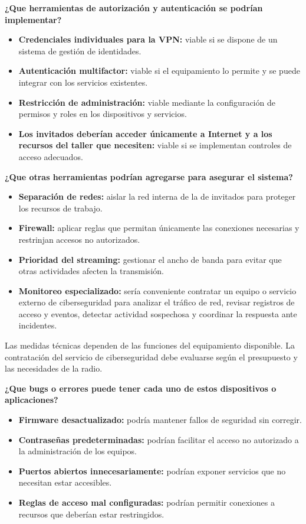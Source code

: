 \documentclass[12pt,a4paper]{article}
\begin{document}
\par\textbf{¿Que herramientas de autorización y autenticación se podrían implementar?}
\begin{itemize}
    \item \textbf{Credenciales individuales para la VPN:} viable si se dispone de un sistema de gestión de identidades.
    \item \textbf{Autenticación multifactor:} viable si el equipamiento lo permite y se puede integrar con los servicios existentes.
    \item \textbf{Restricción de administración:} viable mediante la configuración de permisos y roles en los dispositivos y servicios.
    \item \textbf{Los invitados deberían acceder únicamente a Internet y a los recursos del taller que necesiten:} viable si se implementan controles de acceso adecuados.
\end{itemize}
\par\textbf{¿Que otras herramientas podrían agregarse para asegurar el sistema?}
\begin{itemize}
    \item \textbf{Separación de redes:} aislar la red interna de la de invitados para proteger los recursos de trabajo.
    \item \textbf{Firewall:} aplicar reglas que permitan únicamente las conexiones necesarias y restrinjan accesos no autorizados.
    \item \textbf{Prioridad del streaming:} gestionar el ancho de banda para evitar que otras actividades afecten la transmisión.
    \item \textbf{Monitoreo especializado:} sería conveniente contratar un equipo o servicio externo de ciberseguridad para analizar el tráfico de red, revisar registros de acceso y eventos, detectar actividad sospechosa y coordinar la respuesta ante incidentes.
\end{itemize}
Las medidas técnicas dependen de las funciones del equipamiento disponible. La contratación del servicio de ciberseguridad debe evaluarse según el presupuesto y las necesidades de la radio.
\par\textbf{¿Que bugs o errores puede tener cada uno de estos dispositivos o aplicaciones?}
\begin{itemize}
    \item \textbf{Firmware desactualizado:} podría mantener fallos de seguridad sin corregir.
    \item \textbf{Contraseñas predeterminadas:} podrían facilitar el acceso no autorizado a la administración de los equipos.
    \item \textbf{Puertos abiertos innecesariamente:} podrían exponer servicios que no necesitan estar accesibles.
    \item \textbf{Reglas de acceso mal configuradas:} podrían permitir conexiones a recursos que deberían estar restringidos.
\end{itemize}
\end{document}
